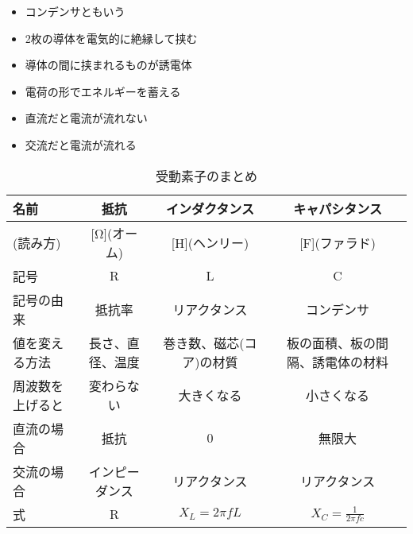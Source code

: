 \begin{multicols}{3}
    \begin{itemize}
        \item コンデンサともいう
        \item 2枚の導体を電気的に絶縁して挟む
        \item 導体の間に挟まれるものが誘電体
        \item 電荷の形でエネルギーを蓄える
        \item 直流だと電流が流れない
        \item 交流だと電流が流れる
    \end{itemize}
\end{multicols}
\begin{table}[htbp]
    \caption{受動素子のまとめ}
    \label{tab:mem}
    \begin{center}
    \begin{tabular}{l|c|c|c} \hline
    名前&抵抗&インダクタンス&キャパシタンス\\ \hline
    [単位](読み方)&[Ω](オーム)&[H](ヘンリー)&[F](ファラド)\\ \hline
    記号&R&L&C\\ \hline
    記号の由来&抵抗率&リアクタンス&コンデンサ\\ \hline
    値を変える方法&長さ、直径、温度&巻き数、磁芯(コア)の材質&板の面積、板の間隔、誘電体の材料\\ \hline
    周波数を上げると&変わらない&大きくなる&小さくなる\\ \hline
    直流の場合&抵抗&0&無限大\\ \hline
    交流の場合&インピーダンス&リアクタンス&リアクタンス\\ \hline
    式& R &$X_L = 2\pi fL$ & $X_C = \frac{1}{2 \pi fc}$
    \end{tabular}
        \end{center}
\end{table}